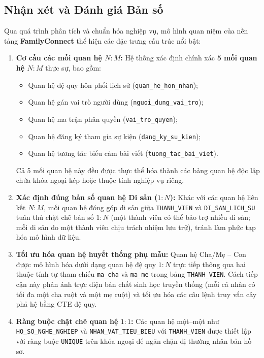 \renewcommand{\arraystretch}{1.0}
\setlength{\arrayrulewidth}{0.4pt}

\subsection{Nhận xét và Đánh giá Bản số}

Qua quá trình phân tích và chuẩn hóa nghiệp vụ, mô hình quan niệm của nền tảng \textbf{FamilyConnect} thể hiện các đặc trưng cấu trúc nổi bật:
\begin{enumerate}[noitemsep,topsep=2pt]
    \item \textbf{Cơ cấu các mối quan hệ $N:M$:} Hệ thống xác định chính xác \textbf{5 mối quan hệ $N:M$} thực sự, bao gồm:
    \begin{itemize}[noitemsep]
        \item Quan hệ đệ quy hôn phối lịch sử (\texttt{quan\_he\_hon\_nhan});
        \item Quan hệ gán vai trò người dùng (\texttt{nguoi\_dung\_vai\_tro});
        \item Quan hệ ma trận phân quyền (\texttt{vai\_tro\_quyen});
        \item Quan hệ đăng ký tham gia sự kiện (\texttt{dang\_ky\_su\_kien});
        \item Quan hệ tương tác biểu cảm bài viết (\texttt{tuong\_tac\_bai\_viet}).
    \end{itemize}
    Cả 5 mối quan hệ này đều được thực thể hóa thành các bảng quan hệ độc lập chứa khóa ngoại kép hoặc thuộc tính nghiệp vụ riêng.
    \item \textbf{Xác định đúng bản số quan hệ Di sản ($1:N$):} Khác với các quan hệ liên kết $N:M$, mối quan hệ đóng góp di sản giữa \texttt{THANH\_VIEN} và \texttt{DI\_SAN\_LICH\_SU} tuân thủ chặt chẽ bản số $1:N$ (một thành viên có thể bảo trợ nhiều di sản; mỗi di sản do một thành viên chịu trách nhiệm lưu trữ), tránh làm phức tạp hóa mô hình dữ liệu.
    \item \textbf{Tối ưu hóa quan hệ huyết thống phụ mẫu:} Quan hệ Cha/Mẹ -- Con được mô hình hóa dưới dạng quan hệ đệ quy $1:N$ trực tiếp thông qua hai thuộc tính tự tham chiếu \texttt{ma\_cha} và \texttt{ma\_me} trong bảng \texttt{THANH\_VIEN}. Cách tiếp cận này phản ánh trực diện bản chất sinh học truyền thống (mỗi cá nhân có tối đa một cha ruột và một mẹ ruột) và tối ưu hóa các câu lệnh truy vấn cây phả hệ bằng CTE đệ quy.
    \item \textbf{Ràng buộc chặt chẽ quan hệ $1:1$:} Các quan hệ một--một như \texttt{HO\_SO\_NGHE\_NGHIEP} và \texttt{NHAN\_VAT\_TIEU\_BIEU} với \texttt{THANH\_VIEN} được thiết lập với ràng buộc \texttt{UNIQUE} trên khóa ngoại để ngăn chặn dị thường nhân bản hồ sơ.
\end{enumerate}